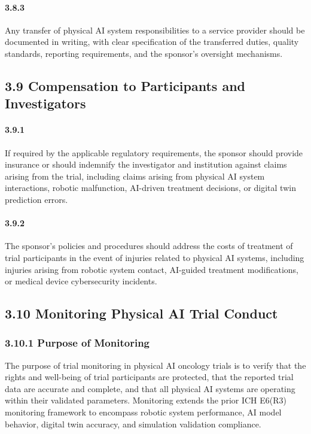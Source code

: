 \paragraph{3.8.3} Any transfer of physical AI system responsibilities to a service provider should be documented in writing, with clear specification of the transferred duties, quality standards, reporting requirements, and the sponsor's oversight mechanisms.

\subsection{3.9 Compensation to Participants and Investigators}

\paragraph{3.9.1} If required by the applicable regulatory requirements, the sponsor should provide insurance or should indemnify the investigator and institution against claims arising from the trial, including claims arising from physical AI system interactions, robotic malfunction, AI-driven treatment decisions, or digital twin prediction errors.

\paragraph{3.9.2} The sponsor's policies and procedures should address the costs of treatment of trial participants in the event of injuries related to physical AI systems, including injuries arising from robotic system contact, AI-guided treatment modifications, or medical device cybersecurity incidents.

\subsection{3.10 Monitoring Physical AI Trial Conduct}

\subsubsection{3.10.1 Purpose of Monitoring}

The purpose of trial monitoring in physical AI oncology trials is to verify that the rights and well-being of trial participants are protected, that the reported trial data are accurate and complete, and that all physical AI systems are operating within their validated parameters. Monitoring extends the prior ICH E6(R3) monitoring framework to encompass robotic system performance, AI model behavior, digital twin accuracy, and simulation validation compliance.

